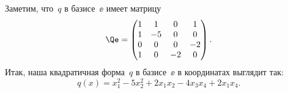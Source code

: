 \begin{solution}
	Заметим, что~$q$ в базисе~$\ee$ имеет матрицу
	\begin{equation}
		\label{eq:num_08:Qe}
		\Qe =
		\begin{pmatrix}
			1 & 1 & 0 & 1 \\
			1 & -5 & 0 & 0 \\
			0 & 0 & 0 & -2 \\
			1 & 0 & -2 & 0
		\end{pmatrix}
		.
	\end{equation}
	Итак, наша квадратичная форма~$q$ в базисе~$\ee$ в координатах выглядит так:
	\[
		q(x)
		=
		x_1^2 - 5x_2^2 + 2x_1 x_2 - 4 x_3 x_4 + 2x_1 x_4
		.
	\]


\end{solution}
